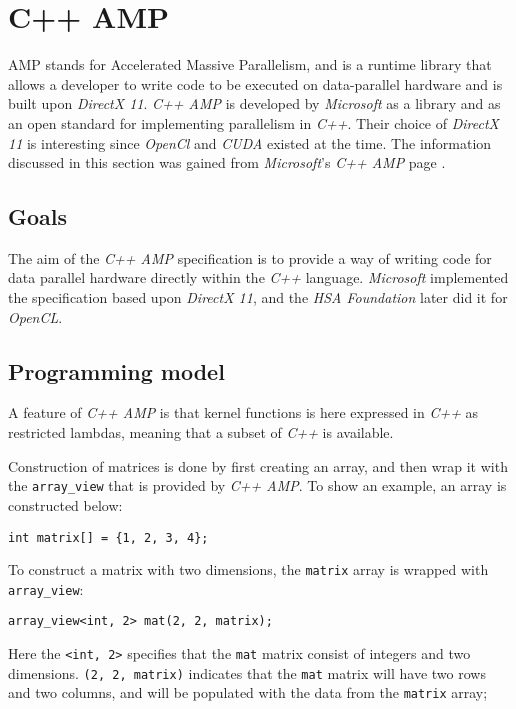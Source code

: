 \section{C++ AMP}
AMP stands for Accelerated Massive Parallelism, and is a runtime library that allows a developer to write code to be executed on data-parallel hardware and is built upon \textit{DirectX 11}. \textit{C++ AMP} is developed by \textit{Microsoft} as a library and as an open standard for implementing parallelism in \textit{C++}. Their choice of \textit{DirectX 11} is interesting since \textit{OpenCl} and \textit{CUDA} existed at the time. The information discussed in this section was gained from \textit{Microsoft}'s \textit{C++ AMP} page \cite{microsoftCppAMP}.


\subsection{Goals}
The aim of the \textit{C++ AMP} specification is to provide a way of writing code for data parallel hardware directly within the \textit{C++} language. \textit{Microsoft} implemented the specification based upon \textit{DirectX 11}, and the \textit{HSA Foundation} later did it for \textit{OpenCL}.

\subsection{Programming model}
A feature of \textit{C++ AMP} is that kernel functions is here expressed in \textit{C++} as restricted lambdas, meaning that a subset of \textit{C++} is available. 

Construction of matrices is done by first creating an array, and then wrap it with the \texttt{array\_view} that is provided by \textit{C++ AMP}. To show an example, an array is constructed below:
\begin{lstlisting}
int matrix[] = {1, 2, 3, 4}; 
\end{lstlisting}
To construct a matrix with two dimensions, the \texttt{matrix} array is wrapped with \texttt{array\_view}:
\begin{lstlisting}
array_view<int, 2> mat(2, 2, matrix); 
\end{lstlisting}
Here the \texttt{<int, 2>} specifies that the \texttt{mat} matrix consist of integers and two dimensions. \texttt{(2, 2, matrix)} indicates that the \texttt{mat} matrix will have two rows and two columns, and will be populated with the data from the \texttt{matrix} array;

